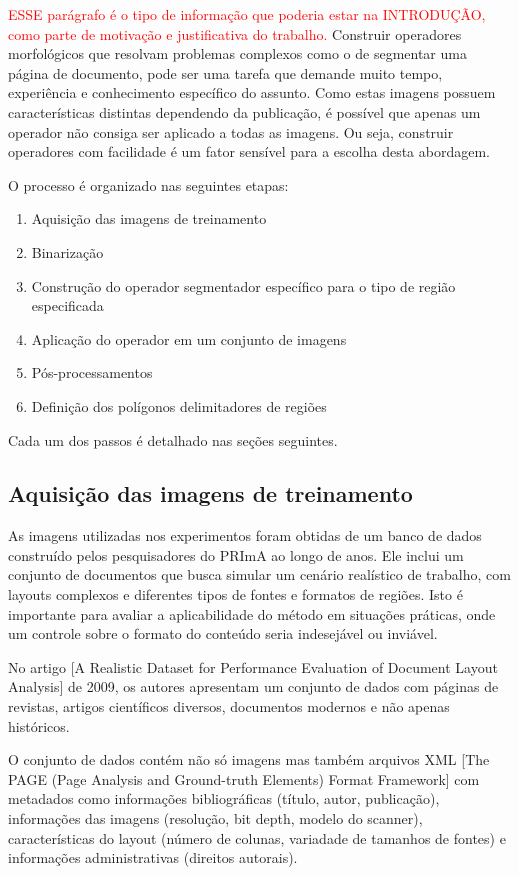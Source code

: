 \documentclass[a4paper,11pt]{article}
\newcommand{\TODO}[1]{\textcolor{red}{#1}}
\begin{document}
\TODO{ESSE parágrafo é o tipo de informação que poderia estar na
  INTRODUÇÃO, como parte de motivação e justificativa do trabalho.}
Construir operadores morfológicos que resolvam problemas complexos como o de segmentar uma página de documento, pode ser uma tarefa que demande muito tempo, experiência e conhecimento específico do assunto. Como estas imagens possuem características distintas dependendo da publicação, é possível que apenas um operador não consiga ser aplicado a todas as imagens. Ou seja, construir operadores com facilidade é um fator sensível para a escolha desta abordagem.


    O processo é organizado nas seguintes etapas:

    \begin{enumerate}
      \item Aquisição das imagens de treinamento
      \item Binarização
      \item Construção do operador segmentador específico para o tipo de região especificada
      \item Aplicação do operador em um conjunto de imagens
      \item Pós-processamentos
      \item Definição dos polígonos delimitadores de regiões
    \end{enumerate}

    Cada um dos passos é detalhado nas seções seguintes.

    \subsection{Aquisição das imagens de treinamento}

      As imagens utilizadas nos experimentos foram obtidas de um banco de dados construído pelos pesquisadores do PRImA ao longo de anos. Ele inclui um conjunto de documentos que busca simular um cenário realístico de trabalho, com layouts complexos e diferentes tipos de fontes e formatos de regiões. Isto é importante para avaliar a aplicabilidade do método em situações práticas, onde um controle sobre o formato do conteúdo seria indesejável ou inviável.

      No artigo [A Realistic Dataset for Performance Evaluation of Document Layout Analysis] de 2009, os autores apresentam um conjunto de dados com páginas de revistas, artigos científicos diversos, documentos modernos e não apenas históricos.

      O conjunto de dados contém não só imagens mas também arquivos XML [The PAGE (Page Analysis and Ground-truth Elements) Format Framework] com metadados como informações bibliográficas (título, autor, publicação), informações das imagens (resolução, bit depth, modelo do scanner), características do layout (número de colunas, variadade de tamanhos de fontes) e informações administrativas (direitos autorais).
\end{document}
